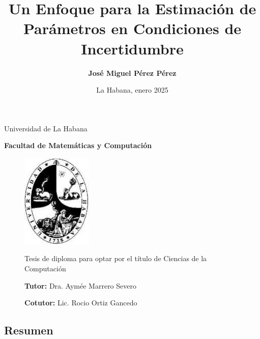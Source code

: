 \documentclass{article}
\begin{document}
\begin{center}
Universidad de La Habana

\textbf{Facultad de Matemáticas y Computación}
\end{center}

\begin{figure}[htbp]
\centering
\includegraphics[width=0.3\textwidth]{images/Universidad_De_La_Habana.jpg}

    \title{ \textbf{ Un Enfoque para la Estimación de Parámetros en Condiciones de Incertidumbre }}
    \begin{center}
        \large    Tesis de diploma para optar por el título de Ciencias de la Computación
    \end{center}
    \author{ \textbf{ José Miguel Pérez Pérez }}
    \date{}
    \maketitle

    \begin{center}

    \textbf{Tutor:}
    \hspace{ 1pt } Dra. Aymée Marrero Severo

    \textbf{Cotutor:}
    \hspace{ 1pt } Lic. Rocio Ortiz Gancedo

    \end{center}

\end{figure}

\begin{center}
\date{ La Habana, enero 2025}
\end{center}

\newpage

\begin{center}
\section*{ \textbf{ Resumen } }
\end{center}
\end{document}
